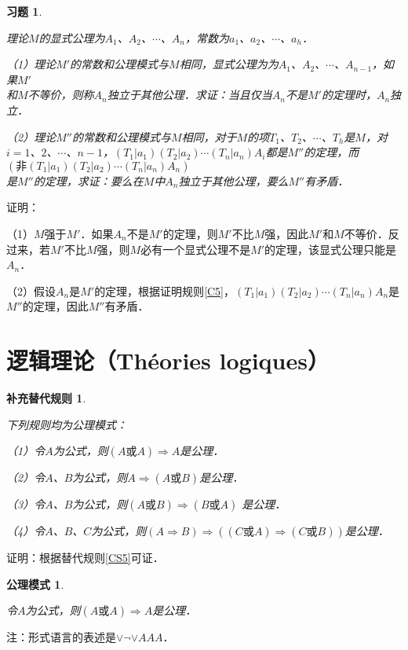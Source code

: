 \documentclass[12pt, a4paper, oneside]{book}
\newtheorem{CScor}{补充替代规则}
\newtheorem{Sch}{公理模式}
\newtheorem{exer}{习题}
\begin{document}
			\begin{exer}\label{exer7}
				\hfill\par
				理论$M$的显式公理为$A_1$、$A_2$、$\cdots$、$A_n$，常数为$a_1$、$a_2$、$\cdots$、$a_h$．
				\par
				（1）理论$M'$的常数和公理模式与$M$相同，显式公理为为$A_1$、$A_2$、$\cdots$、$A_{n-1}$，如果$M'$\\和$M$不等价，则称$A_n$独立于其他公理．求证：当且仅当$A_n$不是$M'$的定理时，$A_n$独立．
				\par
				（2）理论$M''$的常数和公理模式与$M$相同，对于$M$的项$T_1$、$T_2$、$\cdots$、$T_h$是$M$，对$i=1$、$2$、$\cdots$、$n-1$，$(T_1|a_1)(T_2|a_2)\cdots(T_n|a_n)A_i$都是$M''$的定理，而$(\text{非}(T_1|a_1)(T_2|a_2)\cdots(T_n|a_n)A_n)$\\是$M''$的定理，求证：要么在$M$中$A_n$独立于其他公理，要么$M''$有矛盾．
			\end{exer}
			证明：
			\par
			（1）$M$强于$M'$．如果$A_n$不是$M'$的定理，则$M'$不比$M$强，因此$M'$和$M$不等价．反过来，若$M'$不比$M$强，则$M$必有一个显式公理不是$M'$的定理，该显式公理只能是$A_n$．
			\par
			（2）假设$A_n$是$M'$的定理，根据证明规则\ref{C5}，$(T_1|a_1)(T_2|a_2)\cdots(T_n|a_n)A_n$是$M''$的定理，因此$M''$有矛盾．

		\section{逻辑理论（Théories logiques）}
			\begin{CScor}\label{CScor5}
				\hfill\par
				下列规则均为公理模式：
				\par
				（1）令$A$为公式，则$(A\text{或}A)\Rightarrow A$是公理．
				\par
				（2）令$A$、$B$为公式，则$A\Rightarrow(A\text{或}B) $是公理．
				\par
				（3）令$A$、$B$为公式，则$(A\text{或}B)\Rightarrow(B\text{或}A)$ 是公理．
				\par
				（4）令$A$、$B$、$C$为公式，则$(A\Rightarrow B)\Rightarrow((C\text{或}A)\Rightarrow(C\text{或}B))$是公理．
			\end{CScor}
			证明：根据替代规则\ref{CS5}可证．
			
			\begin{Sch}\label{Sch1}
				\hfill\par
				令$A$为公式，则$(A\text{或}A)\Rightarrow A$是公理．
			\end{Sch}
			注：形式语言的表述是$\lor\neg\lor AAA$．
			
\end{document}
